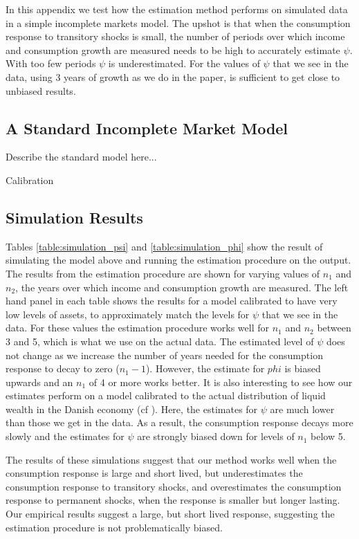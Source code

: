 
In this appendix we test how the estimation method performs on simulated data in a simple incomplete markets model. The upshot is that when the consumption response to transitory shocks is small, the number of periods over which income and consumption growth are measured needs to be high to accurately estimate $\psi$. With too few periods $\psi$ is underestimated. For the values of $\psi$ that we see in the data, using 3 years of growth as we do in the paper, is sufficient to get close to unbiased results.

\subsection{A Standard Incomplete Market Model}
Describe the standard model here...

Calibration

\subsection{Simulation Results}
Tables \ref{table:simulation_psi} and \ref{table:simulation_phi} show the result of simulating the model above and running the estimation procedure on the output. The results from the estimation procedure are shown for varying values of $n_1$ and $n_2$, the years over which income and consumption growth are measured. The left hand panel in each table shows the results for a model calibrated to have very low levels of assets, to approximately match the levels for $\psi$ that we see in the data. For these values the estimation procedure works well for $n_1$ and $n_2$ between 3 and 5, which is what we use on the actual data. The estimated level of $\psi$ does not change as we increase the number of years needed for the consumption response to decay to zero ($n_1-1$). However, the estimate for $phi$ is biased upwards and an $n_1$ of 4 or more works better. It is also interesting to see how our estimates perform on a model calibrated to the actual distribution of liquid wealth in the Danish economy (cf \cite{carroll_distribution_2016}). Here, the estimates for $\psi$ are much lower than those we get in the data. As a result, the consumption response decays more slowly and the estimates for $\psi$ are strongly biased down for levels of $n_1$ below 5.

The results of these simulations suggest that our method works well when the consumption response is large and short lived, but underestimates the consumption response to transitory shocks, and overestimates the consumption response to permanent shocks, when the response is smaller but longer lasting. Our empirical results suggest a large, but short lived response, suggesting the estimation procedure is not problematically biased.

